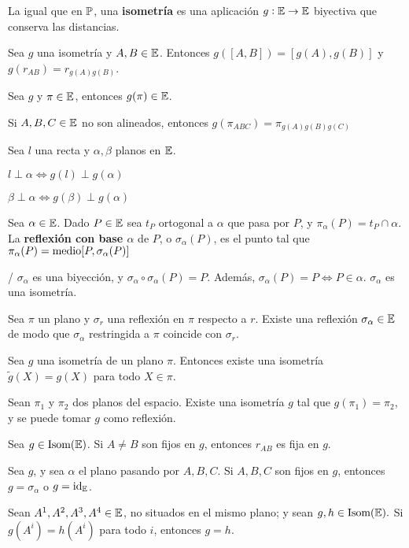  La igual que en $\P$, una \textbf{isometría} es una aplicación $g:\E \rightarrow\E$ biyectiva que conserva las distancias.

 Sea $g$ una isometría y $A, B \in \E$. Entonces $g([A,B]) = [g(A), g(B)]$ y $g(r_{AB}) = r_{g(A)g(B)}$.

 Sea $g$  y $\pi \in \E$, entonces $g(\pi) \in \E$.

 Si $A,B,C \in \E$ no son alineados, entonces $g(\pi_{ABC}) = \pi_{g(A)g(B)g(C)}$

 Sea $l$ una recta y $\alpha, \beta$ planos en $\E$.
\begin{itemizex}
	\item $l\perp \alpha \iff g(l) \perp g(\alpha)$
	\item $\beta \perp \alpha \iff g(\beta) \perp g(\alpha)$
\end{itemizex}

 Sea $\alpha \in \E$. Dado $P \in \E$ sea $t_P$ ortogonal a $\alpha$ que pasa por $P$, y $\pi_{\alpha}(P) = t_P \cap \alpha$. La \textbf{reflexión con base $\alpha$} de $P$, o $\sigma_\alpha(P)$, es el punto tal que $\pi_\alpha(P) = \m[P, \sigma_\alpha(P)]$   

/ $\sigma_\alpha$ es una biyección, y $\sigma_\alpha \circ \sigma_\alpha (P) = P$. Además, $\sigma_\alpha(P) = P \iff P \in \alpha$. $\sigma_\alpha$ es una isometría.

 Sea $\pi$ un plano y $\sigma_r$ una reflexión en $\pi$ respecto a $r$. Existe una reflexión $\sigma_\alpha \in \E$ de modo que $\sigma_\alpha$ restringida a $\pi$ coincide con $\sigma_r$.

 Sea $g$ una isometría de un plano $\pi$. Entonces existe una isometría $\tilde{g}(X) = g(X)$ para todo $X\in\pi$.

 Sean $\pi_1$ y $\pi_2$ dos planos del espacio. Existe una isometría $g$ tal que $g(\pi_1) = \pi_2$, y se puede tomar $g$ como reflexión.

 Sea $g\in \iso{(\E)}$. Si $A\neq B$ son fijos en $g$, entonces $r_{AB}$ es fija en $g$.

 Sea $g$, y sea $\alpha$ el plano pasando por $A,B,C$. Si $A,B,C$ son fijos en $g$, entonces $g = \sigma_\alpha$ o $g = \text{id}_{\E}$.

 Sean $A^1,A^2, A^3, A^4 \in \E$, no situados en el mismo plano; y sean $g,h\in \iso{(\E)}.$ Si $g(A^i) = h(A^i)$ para todo $i$, entonces $g = h$.

